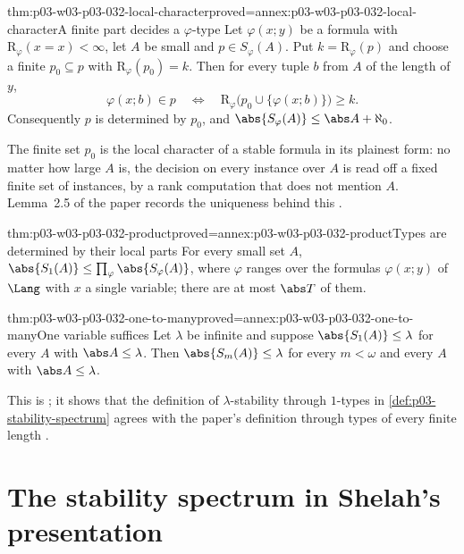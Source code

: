 \begin{hblemma}{thm:p03-w03-p03-032-local-character}{proved=annex:p03-w03-p03-032-local-character}{A finite part decides a \(\varphi\)-type}
Let \(\varphi(x;y)\) be a formula with
\(\mathrm R_\varphi(x=x)<\infty\), let \(A\) be small and
\(p\in S_\varphi(A)\).  Put \(k=\mathrm R_\varphi(p)\) and choose a finite
\(p_0\subseteq p\) with \(\mathrm R_\varphi(p_0)=k\).  Then for every tuple
\(b\) from \(A\) of the length of \(y\),
\[
  \varphi(x;b)\in p
  \quad\Longleftrightarrow\quad
  \mathrm R_\varphi\bigl(p_0\cup\{\varphi(x;b)\}\bigr)\geq k .
\]
Consequently \(p\) is determined by \(p_0\), and
\(\abs{S_\varphi(A)}\leq\abs A+\aleph_0\).
\end{hblemma}

The finite set \(p_0\) is the local character of a stable formula in its
plainest form: no matter how large \(A\) is, the decision on every instance
over \(A\) is read off a fixed finite set of instances, by a rank
computation that does not mention \(A\).  Lemma~2.5 of the paper records the
uniqueness behind this
\cite[Lemma~2.5\,(C), (D), p.~300]{Shelah1971Stability}.

\begin{hblemma}{thm:p03-w03-p03-032-product}{proved=annex:p03-w03-p03-032-product}{Types are determined by their local parts}
For every small set \(A\),
\(\abs{S_1(A)}\leq\prod_{\varphi}\abs{S_\varphi(A)}\), where \(\varphi\)
ranges over the formulas \(\varphi(x;y)\) of \(\Lang\) with \(x\) a single
variable; there are at most \(\abs T\) of them.
\end{hblemma}

\begin{hblemma}{thm:p03-w03-p03-032-one-to-many}{proved=annex:p03-w03-p03-032-one-to-many}{One variable suffices}
Let \(\lambda\) be infinite and suppose \(\abs{S_1(A)}\leq\lambda\) for every
\(A\) with \(\abs A\leq\lambda\).  Then \(\abs{S_m(A)}\leq\lambda\) for every
\(m<\omega\) and every \(A\) with \(\abs A\leq\lambda\).
\end{hblemma}

This is \cite[Lemma~2.10, p.~303]{Shelah1971Stability}; it shows that the
definition of \(\lambda\)-stability through \(1\)-types in
\cref{def:p03-stability-spectrum} agrees with the paper's definition through
types of every finite length \cite[Definition~2.1\,(C),
p.~297]{Shelah1971Stability}.

\section{The stability spectrum in Shelah's presentation}
\label{sec:p03-w03-p03-032-shelah}

